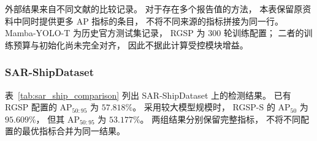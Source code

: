 \documentclass[journal]{IEEEtran}
\begin{document}
\begin{table}[!tbp]
\smallskip
\begin{minipage}{\linewidth}
\footnotesize
外部结果来自不同文献的比较记录。
对于存在多个报告值的方法，
本表保留原资料中同时提供更多 AP 指标的条目，
不将不同来源的指标拼接为同一行。
Mamba-YOLO-T 为历史官方测试集记录，
RGSP 为 300 轮训练配置；
二者的训练预算与初始化尚未完全对齐，
因此不据此计算受控模块增益。
\end{minipage}
\end{table}


\subsubsection{SAR-ShipDataset}
\label{sec:sar_ship_results}

表~\ref{tab:sar_ship_comparison}
列出 SAR-ShipDataset 上的检测结果。
已有 RGSP 配置的 AP$_{50:95}$ 为 $57.818\%$。
采用较大模型规模时，
RGSP-S 的 AP$_{50}$ 为 $95.609\%$，
但其 AP$_{50:95}$ 为 $53.177\%$。
两组结果分别保留完整指标，
不将不同配置的最优指标合并为同一结果。
\end{document}

